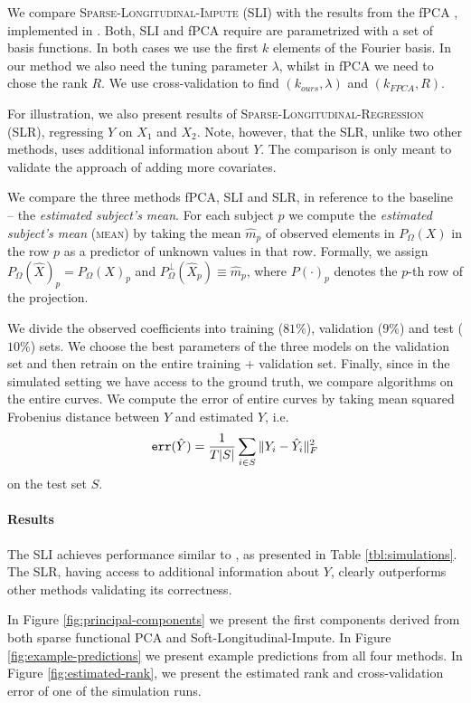 \documentclass[preprint]{imsart}
\numberwithin{equation}{section}
\theoremstyle{plain}
\begin{document}
We compare \textsc{Sparse-Longitudinal-Impute} (SLI) with the results from the fPCA \citep{james2000principal}, implemented in \citet{peng2009geometric}. Both, SLI and fPCA require are parametrized with a set of basis functions. In both cases we use the first $k$ elements of the Fourier basis. In our method we also need the tuning parameter $\lambda$, whilst in fPCA we need to chose the rank $R$. We use cross-validation to find $(k_{ours},\lambda)$ and $(k_{FPCA},R)$.

For illustration, we also present results of \textsc{Sparse-Longitudinal-Regression} (SLR), regressing $Y$ on $X_1$ and $X_2$. Note, however, that the SLR, unlike two other methods, uses additional information about $Y$. The comparison is only meant to validate the approach of adding more covariates.

We compare the three methods fPCA, SLI and SLR, in reference to the baseline -- the {\it estimated subject's mean}. For each subject $p$ we compute the {\it estimated subject's mean} (\textsc{mean}) by taking the mean $\hat{m}_p$ of observed elements in $P_\Omega(X)$ in the row $p$ as a predictor of unknown values in that row. Formally, we assign $P_\Omega(\hat{X})_p = P_\Omega(X)_p$ and $P^\perp_\Omega (\hat{X}_p) \equiv \hat{m}_p$, where $P(\cdot)_p$ denotes the $p$-th row of the projection.

We divide the observed coefficients into training ($81\%$), validation ($9\%$) and test ($10\%$) sets. We choose the best parameters of the three models on the validation set and then retrain on the entire training + validation set. Finally, since in the simulated setting we have access to the ground truth, we compare algorithms on the entire curves. We compute the error of entire curves by taking mean squared Frobenius distance between $Y$ and estimated $\hat{Y}$, i.e.
\[
 \verb|err|(\hat{Y}) = \frac{1}{T|S|} \sum_{i\in S} \|Y_i - \hat{Y}_i \|_F^2
 \]
 on the test set $S$.
 
\paragraph{Results}

The SLI achieves performance similar to \citep{james2000principal}, as presented in Table \ref{tbl:simulations}. The SLR, having access to additional information about $Y$, clearly outperforms other methods validating its correctness.

In Figure \ref{fig:principal-components} we present the first components derived from both sparse functional PCA and Soft-Longitudinal-Impute. In Figure \ref{fig:example-predictions} we present example predictions from all four methods. In Figure \ref{fig:estimated-rank}, we present the estimated rank and cross-validation error of one of the simulation runs.
\end{document}
